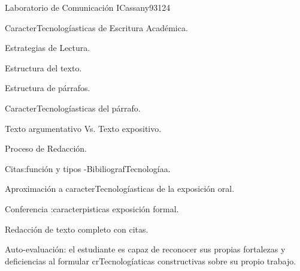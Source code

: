\begin{syllabus}
\begin{competences}
    \item {}
    \item {}
    \item {}
\end{competences}

\begin{unit}{Laboratorio de Comunicación I}{}{Cassany93}{12}{4}
   \begin{topics}
      \item CaracterTecnologíasticas de Escritura Académica.
      \item Estrategias de Lectura.
      \item Estructura del texto.
      \item Estructura de párrafos.
      \item CaracterTecnologíasticas del párrafo.
      \item Texto argumentativo Vs. Texto expositivo.
      \item Proceso de Redacción.
      \item Citas:función y tipos -BibiliografTecnologíaa.
      \item Aproximación a caracterTecnologíasticas de la exposición oral.
      \item Conferencia :caracterpisticas exposición formal.
      \item Redacción de texto completo con citas.  
   \end{topics}
   \begin{learningoutcomes}
      \item Auto-evaluación: el estudiante es capaz de reconocer sus propias fortalezas y deficiencias al formular crTecnologíaticas constructivas sobre su propio trabajo.
   \end{learningoutcomes}
\end{unit}



\begin{coursebibliography}
\end{coursebibliography}

\end{syllabus}
